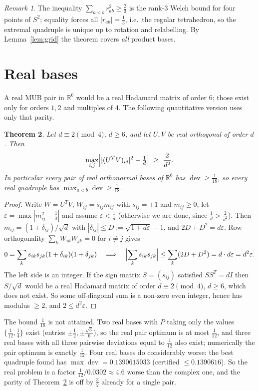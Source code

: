 \documentclass[11pt,a4paper]{article}
\newtheorem{theorem}{Theorem}[section]
\theoremstyle{remark}
\newtheorem{remark}[theorem]{Remark}
\newcommand{\R}{\mathbb{R}}
\newcommand{\dev}{\operatorname{dev}}
\newcommand{\eps}{\varepsilon}
\begin{document}
\begin{remark}
The inequality $\sum_{a<b}r_{ab}^2\ge\tfrac23$ is the rank-$3$ Welch bound for four points of
$S^2$; equality forces all $|r_{ab}|=\tfrac13$, i.e.\ the regular tetrahedron, so the extremal
quadruple is unique up to rotation and relabelling.  By Lemma~\ref{lem:grid} the theorem
covers \emph{all} product bases.
\end{remark}

\section{Real bases}
\label{sec:real}

A real MUB pair in $\R^6$ would be a real Hadamard matrix of order $6$; those exist only for
orders $1,2$ and multiples of $4$.  The following quantitative version uses only that parity.

\begin{theorem}\label{thm:real}
Let $d\equiv2\pmod4$, $d\ge6$, and let $U,V$ be real orthogonal of order $d$.  Then
\[
\max_{i,j}\Bigl||(U^TV)_{ij}|^2-\tfrac1d\Bigr|\ \ge\ \frac{2}{d^2}.
\]
In particular every pair of real orthonormal bases of $\R^6$ has $\dev\ge\tfrac1{18}$, so
every real quadruple has $\max_{a<b}\dev\ge\tfrac1{18}$.
\end{theorem}
\begin{proof}
Write $W=U^TV$, $W_{ij}=s_{ij}m_{ij}$ with $s_{ij}=\pm1$ and $m_{ij}\ge0$, let
$\eps=\max|m_{ij}^2-\tfrac1d|$ and assume $\eps<\tfrac1d$ (otherwise we are done, since
$\tfrac1d>\tfrac2{d^2}$).  Then $m_{ij}=(1+\delta_{ij})/\sqrt d$ with
$|\delta_{ij}|\le D:=\sqrt{1+d\eps}-1$, and $2D+D^2=d\eps$.  Row orthogonality
$\sum_kW_{ik}W_{jk}=0$ for $i\ne j$ gives
\[
0=\sum_ks_{ik}s_{jk}(1+\delta_{ik})(1+\delta_{jk})
\quad\Longrightarrow\quad
\Bigl|\sum_ks_{ik}s_{jk}\Bigr|\le\sum_k(2D+D^2)=d\cdot d\eps=d^2\eps .
\]
The left side is an integer.  If the sign matrix $S=(s_{ij})$ satisfied $SS^T=dI$ then
$S/\sqrt d$ would be a real Hadamard matrix of order $d\equiv2\pmod4$, $d\ge6$, which does not
exist.  So some off-diagonal sum is a non-zero even integer, hence has modulus $\ge2$, and
$2\le d^2\eps$.
\end{proof}

The bound $\tfrac1{18}$ is not attained.  Two real bases with $P$ taking only the values
$\{\tfrac1{12},\tfrac14\}$ exist (entries $\pm\tfrac12,\pm\tfrac{\sqrt3}{6}$), so the real
pair optimum is at most $\tfrac1{12}$, and three real bases with all three pairwise deviations
equal to $\tfrac1{12}$ also exist; numerically the pair optimum is exactly $\tfrac1{12}$.
Four real bases do considerably worse: the best quadruple found has
$\max\dev=0.1390615033$ (certified $\le0.1390616$).  So the real problem is a factor
$\tfrac1{12}/0.0302\approx4.6$ worse than the complex one, and the parity of
Theorem~\ref{thm:real} is off by $\tfrac32$ already for a single pair.
\end{document}
